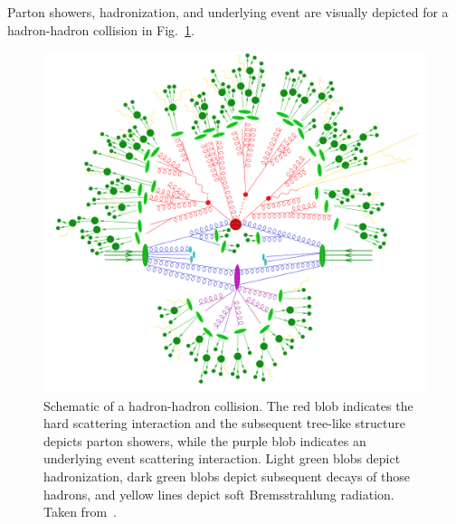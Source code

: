 Parton showers, hadronization, and underlying event are visually depicted for a hadron-hadron collision in Fig.~\ref{fig:pp_event_schematic}.

\begin{figure} [htbp!]
    \centering
    \includegraphics[width=0.7\linewidth]{figures/physics_of_pp/pp_event_schematic.png}
    \caption[Schematic of a hadron-hadron collision. Taken from~\cite{Hoche:2014rga}.]{Schematic of a hadron-hadron collision. The red blob indicates the hard scattering interaction and the subsequent tree-like structure depicts parton showers, while the purple blob indicates an underlying event scattering interaction. Light green blobs depict hadronization, dark green blobs depict subsequent decays of those hadrons, and yellow lines depict soft Bremsstrahlung radiation. Taken from~\cite{Hoche:2014rga}.}
    \label{fig:pp_event_schematic}
\end{figure}
